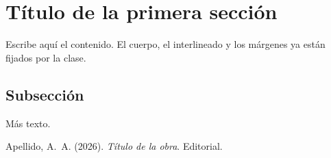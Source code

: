 \documentclass[letterpaper]{wordglow}   %
\begin{document}
\maketitle

\wgindice
\clearpage
{}

\section{T\'itulo de la primera secci\'on}

Escribe aqu\'i el contenido. El cuerpo, el interlineado y los m\'argenes
ya est\'an fijados por la clase.

\subsection{Subsecci\'on}

M\'as texto.


\clearpage
\begin{referencias}
 Apellido, A.~A. (2026). \textit{T\'itulo de la obra}. Editorial.
\end{referencias}

\wgcierre
\end{document}
